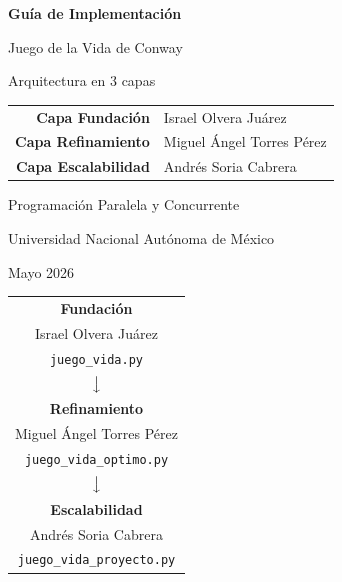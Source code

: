 \documentclass[12pt,a4paper]{article}
\begin{document}
\begin{titlepage}
  \centering
  \vspace*{3cm}

  {\Huge \textbf{Guía de Implementación}}

  \vspace{0.5cm}
  {\Large Juego de la Vida de Conway}

  \vspace{0.3cm}
  {\large Arquitectura en 3 capas}

  \vspace{1.5cm}

  \begin{tabular}{rl}
    \textbf{Capa Fundación}      & Israel Olvera Juárez \\
    \textbf{Capa Refinamiento}   & Miguel Ángel Torres Pérez \\
    \textbf{Capa Escalabilidad}  & Andrés Soria Cabrera \\
  \end{tabular}

  \vspace{2cm}

  {\large Programación Paralela y Concurrente}

  {\large Universidad Nacional Autónoma de México}

  \vspace{0.3cm}
  {\large Mayo 2026}

  \vspace{0.5cm}

  \begin{center}
  \renewcommand{\arraystretch}{2.5}
  \begin{tabular}{|c|}
    \hline
    \cellcolor{green!15}
    \textbf{\large Fundación}  \\
    \cellcolor{green!15}
    Israel Olvera Juárez  \\
    \cellcolor{green!15}
    \texttt{juego\_vida.py} \\
    \hline
    \multicolumn{1}{c}{$\big\downarrow$} \\
    \hline
    \cellcolor{yellow!15}
    \textbf{\large Refinamiento} \\
    \cellcolor{yellow!15}
    Miguel Ángel Torres Pérez \\
    \cellcolor{yellow!15}
    \texttt{juego\_vida\_optimo.py} \\
    \hline
    \multicolumn{1}{c}{$\big\downarrow$} \\
    \hline
    \cellcolor{red!15}
    \textbf{\large Escalabilidad} \\
    \cellcolor{red!15}
    Andrés Soria Cabrera \\
    \cellcolor{red!15}
    \texttt{juego\_vida\_proyecto.py} \\
    \hline
  \end{tabular}
  \end{center}
\end{titlepage}
\end{document}

